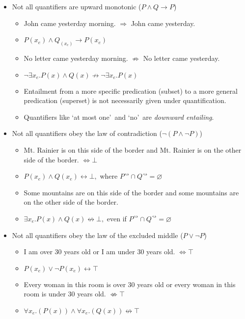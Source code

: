 \documentclass[a4paper]{article}
\begin{document}
\begin{itemize}

  \item Not all quantifiers are upward monotonic ($P \land Q \rightarrow P$)
  \begin{itemize}
    \item John came yesterday morning. $\Rightarrow$ John came yesterday.
    \item $P(x_e) \land Q_(x_e) \rightarrow P(x_e)$
    \item No letter came yesterday morning. $\not\Rightarrow$ No letter came yesterday.
    \item $\neg\exists x_e.P(x) \land Q(x) \not\rightarrow \neg\exists x_e.P(x)$
    \item Entailment from a more specific predication (subset) to a more general predication (superset) is not necessarily given under quantification.
    \item Quantifiers like \lq at most one\rq\ and \lq no\rq\ are \emph{downward entailing}.
  \end{itemize}

  \item Not all quantifiers obey the law of contradiction ($\neg (P \land \neg P)$)
  \begin{itemize}
    \item Mt. Rainier is on this side of the border and Mt. Rainier is on the other side of the border. $\Leftrightarrow \bot$
    \item $P(x_e) \land Q(x_e) \leftrightarrow \bot,$ where $P^\rightsquigarrow \cap Q^\rightsquigarrow = \varnothing$
    \item Some mountains are on this side of the border and some mountains are on the other side of the border.
    \item $\exists x_e.P(x) \land Q(x) \not \leftrightarrow \bot,$ even if $P^\rightsquigarrow \cap Q^\rightsquigarrow = \varnothing$
  \end{itemize}

  \item Not all quantifiers obey the law of the excluded middle ($P \lor \neg P$)
  \begin{itemize}
  	\item I am over 30 years old or I am under 30 years old. $\Leftrightarrow \top$
    \item $P(x_e) \lor \neg P(x_e) \leftrightarrow \top$
    \item Every woman in this room is over 30 years old or every woman in this room is under 30 years old. $\not \Leftrightarrow \top$
    \item $\forall x_e.(P(x)) \land \forall x_e.(Q(x)) \not\leftrightarrow \top$
  \end{itemize}


\end{itemize}
\end{document}
